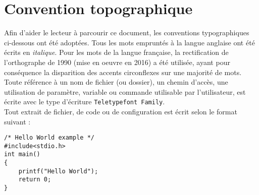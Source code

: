 \documentclass[
11pt, %
twoside, %
french, %
singlespacing, %
nolistspacing, %
headsepline, %
]{MastersDoctoralThesis} %
\begin{document}

\tableofcontents %
\listoffigures %
\listoftables %


\chapter*{Convention topographique}

{\setlength{\parindent}{0cm}

Afin d’aider le lecteur à parcourir ce document, les conventions typographiques ci-dessous ont été adoptées.
Tous les mots empruntés à la langue anglaise ont été écrits en \textit{italique}. Pour les mots de la langue française, la rectification de l'orthographe de 1990 (mise en oeuvre en 2016) a été utilisée, ayant pour conséquence la disparition des accents circonflexes sur une majorité de mots.\\

Toute référence à un nom de fichier (ou dossier), un chemin d’accès, une utilisation de paramètre, variable ou commande utilisable par l’utilisateur, est écrite avec le type d'écriture \texttt{Teletypefont Family}. \\

Tout extrait de fichier, de code ou de configuration est écrit selon le format suivant :\\

}


\begin{tcolorbox}
  [top=-1mm, bottom=-3mm, left=0mm, right=0mm, enhanced,breakable,
  attach boxed title to top center={yshift=-3mm,yshifttext=-1mm},colback=LightGray,colframe=DarkGray,
  colbacktitle=DarkGray, fonttitle=\bfseries,boxed title style={size=small,colframe=DarkGray},
  title=HelloWorld.c ]
\begin{verbatim}
/* Hello World example */
#include<stdio.h>
int main()
{
    printf("Hello World");
    return 0;
}
\end{verbatim}
\end{tcolorbox}

\end{document}
